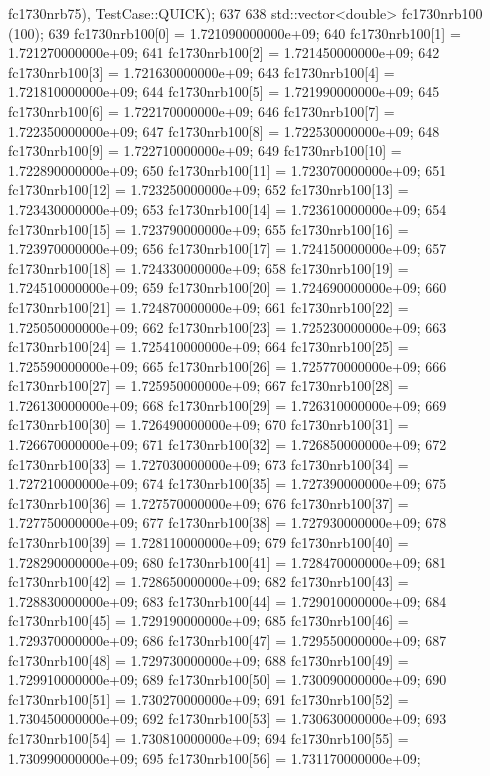 \begin{DoxyCode}
      fc1730nrb75), TestCase::QUICK);
637 
638   std::vector<double> fc1730nrb100 (100);
639   fc1730nrb100[0] = 1.721090000000e+09;
640   fc1730nrb100[1] = 1.721270000000e+09;
641   fc1730nrb100[2] = 1.721450000000e+09;
642   fc1730nrb100[3] = 1.721630000000e+09;
643   fc1730nrb100[4] = 1.721810000000e+09;
644   fc1730nrb100[5] = 1.721990000000e+09;
645   fc1730nrb100[6] = 1.722170000000e+09;
646   fc1730nrb100[7] = 1.722350000000e+09;
647   fc1730nrb100[8] = 1.722530000000e+09;
648   fc1730nrb100[9] = 1.722710000000e+09;
649   fc1730nrb100[10] = 1.722890000000e+09;
650   fc1730nrb100[11] = 1.723070000000e+09;
651   fc1730nrb100[12] = 1.723250000000e+09;
652   fc1730nrb100[13] = 1.723430000000e+09;
653   fc1730nrb100[14] = 1.723610000000e+09;
654   fc1730nrb100[15] = 1.723790000000e+09;
655   fc1730nrb100[16] = 1.723970000000e+09;
656   fc1730nrb100[17] = 1.724150000000e+09;
657   fc1730nrb100[18] = 1.724330000000e+09;
658   fc1730nrb100[19] = 1.724510000000e+09;
659   fc1730nrb100[20] = 1.724690000000e+09;
660   fc1730nrb100[21] = 1.724870000000e+09;
661   fc1730nrb100[22] = 1.725050000000e+09;
662   fc1730nrb100[23] = 1.725230000000e+09;
663   fc1730nrb100[24] = 1.725410000000e+09;
664   fc1730nrb100[25] = 1.725590000000e+09;
665   fc1730nrb100[26] = 1.725770000000e+09;
666   fc1730nrb100[27] = 1.725950000000e+09;
667   fc1730nrb100[28] = 1.726130000000e+09;
668   fc1730nrb100[29] = 1.726310000000e+09;
669   fc1730nrb100[30] = 1.726490000000e+09;
670   fc1730nrb100[31] = 1.726670000000e+09;
671   fc1730nrb100[32] = 1.726850000000e+09;
672   fc1730nrb100[33] = 1.727030000000e+09;
673   fc1730nrb100[34] = 1.727210000000e+09;
674   fc1730nrb100[35] = 1.727390000000e+09;
675   fc1730nrb100[36] = 1.727570000000e+09;
676   fc1730nrb100[37] = 1.727750000000e+09;
677   fc1730nrb100[38] = 1.727930000000e+09;
678   fc1730nrb100[39] = 1.728110000000e+09;
679   fc1730nrb100[40] = 1.728290000000e+09;
680   fc1730nrb100[41] = 1.728470000000e+09;
681   fc1730nrb100[42] = 1.728650000000e+09;
682   fc1730nrb100[43] = 1.728830000000e+09;
683   fc1730nrb100[44] = 1.729010000000e+09;
684   fc1730nrb100[45] = 1.729190000000e+09;
685   fc1730nrb100[46] = 1.729370000000e+09;
686   fc1730nrb100[47] = 1.729550000000e+09;
687   fc1730nrb100[48] = 1.729730000000e+09;
688   fc1730nrb100[49] = 1.729910000000e+09;
689   fc1730nrb100[50] = 1.730090000000e+09;
690   fc1730nrb100[51] = 1.730270000000e+09;
691   fc1730nrb100[52] = 1.730450000000e+09;
692   fc1730nrb100[53] = 1.730630000000e+09;
693   fc1730nrb100[54] = 1.730810000000e+09;
694   fc1730nrb100[55] = 1.730990000000e+09;
695   fc1730nrb100[56] = 1.731170000000e+09;

\end{DoxyCode}
